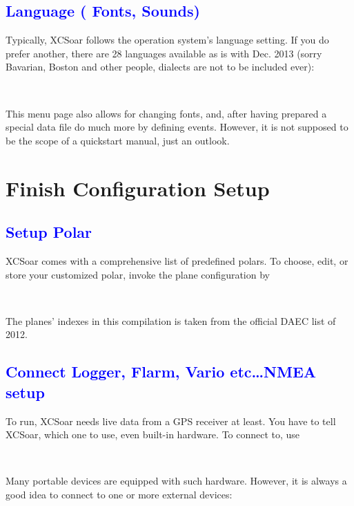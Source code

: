 \subsection*{\textcolor{blue}{Language ( Fonts, Sounds)}}
Typically, XCSoar follows the operation system's language setting. If you do 
prefer another, there are 28 languages available as is with Dec. 2013 (sorry 
Bavarian, Boston and other people, dialects are not to be included ever):

\begin{flushleft}\hspace*{1cm}\sk\blink{}\blink{}\\\end{flushleft}

This menu page also allows for changing fonts, and, after having prepared a 
special data file do much more by defining events.  However, it is not 
supposed to be the scope of a quickstart manual, just an outlook.

\newpage\section{Finish Configuration Setup}
\subsection*{\textcolor{blue}{Setup Polar}}
XCSoar comes with a comprehensive list of predefined polars.  To choose, edit, 
or store your customized polar, invoke the plane configuration by 
\begin{flushleft}\hspace*{1cm}\blink{}\\\end{flushleft}
The planes' indexes in this compilation is taken from the official DAEC list 
of 2012.

\subsection*{\textcolor{blue}{Connect Logger, Flarm, Vario etc\dots NMEA setup}}
To run, XCSoar needs live data from a GPS receiver at least. You have to tell 
XCSoar, which one to use, even built-in hardware. To connect to, use
\begin{flushleft}\hspace*{1cm}\blink{}\\\end{flushleft}
Many portable devices are equipped with such hardware.  However, it is always 
a good idea to connect to one or more external devices:

